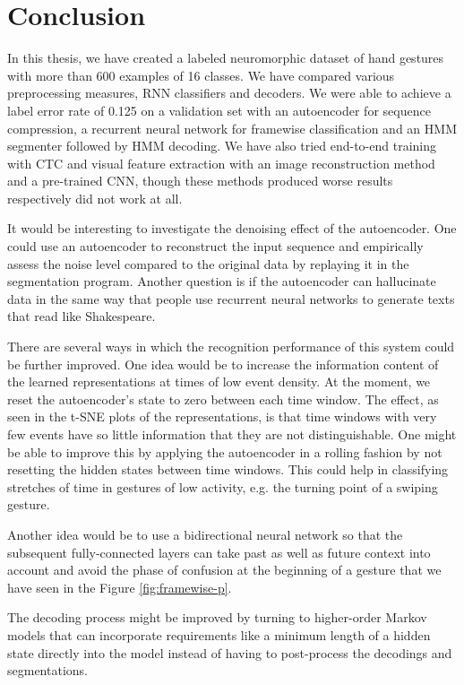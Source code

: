 \chapter{Conclusion}
\label{cha:conclusion}

In this thesis, we have created a labeled neuromorphic dataset of hand gestures
with more than 600 examples of 16 classes. We have compared various
preprocessing measures, RNN classifiers and decoders. We were able to achieve a
label error rate of 0.125 on a validation set with an autoencoder for sequence
compression, a recurrent neural network for framewise classification and an HMM
segmenter followed by HMM decoding. We have also tried end-to-end training with
CTC and visual feature extraction with an image reconstruction method and a
pre-trained CNN, though these methods produced worse results respectively did
not work at all.

It would be interesting to investigate the denoising effect of the autoencoder.
One could use an autoencoder to reconstruct the input sequence and empirically
assess the noise level compared to the original data by replaying it in the
segmentation program. Another question is if the autoencoder can hallucinate
data in the same way that people use recurrent neural networks to generate texts
that read like Shakespeare.

There are several ways in which the recognition performance of this system could
be further improved. One idea would be to increase the information content of
the learned representations at times of low event density. At the moment, we
reset the autoencoder's state to zero between each time window. The effect, as
seen in the t-SNE plots of the representations, is that time windows with very
few events have so little information that they are not distinguishable. One
might be able to improve this by applying the autoencoder in a rolling fashion
by not resetting the hidden states between time windows. This could help in
classifying stretches of time in gestures of low activity, e.g. the turning
point of a swiping gesture.

Another idea would be to use a bidirectional neural network so that the
subsequent fully-connected layers can take past as well as future context into
account and avoid the phase of confusion at the beginning of a gesture that we
have seen in the Figure \ref{fig:framewise-p}.

The decoding process might be improved by turning to higher-order Markov models
that can incorporate requirements like a minimum length of a hidden state
directly into the model instead of having to post-process the decodings and
segmentations.

